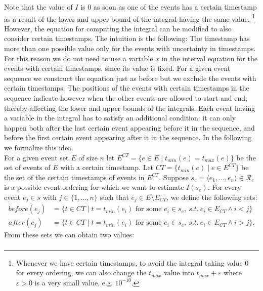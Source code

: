 \begin{itemize}
%
%
%
Note that the value of $I$ is 0 as soon as one of the events has a certain timestamp as a result of the lower and upper bound of the integral having the same value.
\footnote{Whenever we have certain timestamps, to avoid the integral taking value 0 for every ordering, we can also change the $t_{max}$ value into $t_{max}+\varepsilon$ where $\varepsilon > 0$ is a very small value, e.g. $10^{-10}$.}
However, the equation for computing the integral can be modified to also consider certain timestamps. 
The intuition is the following: The timestamp has more than one possible value only for the events with uncertainty in timestamps.
For this reason we do not need to use a variable $x$ in the interval equation for the events with certain timestamps, since its value is fixed.
For a given event sequence we construct the equation just as before but we exclude the events with certain timestamps.
The positions of the events with certain timestamps in the sequence indicate however when the other events are allowed to start and end, thereby affecting the lower and upper bounds of the integrals.
Each event having a variable in the integral has to satisfy an additional condition:
it can only happen both after the last certain event appearing before it in the sequence, and before the first certain event appearing after it in the sequence.
In the following we formalize this idea.\\
For a given event set $E$ of size $n$ let 
$E^{CT} = \{e \in E \mid t_{min}(e) = t_{max}(e)\}$
be the set of events of $E$ with a certain timestamp.
Let $CT = \{t_{min}(e) \mid e \in E^{CT}\}$ be the set of the certain timestamps of events in $E^{CT}$.
Suppose $s_e=\langle e_1,...,e_n \rangle \in \mathcal{R}_e$ is a possible event ordering for which we want to estimate $I(s_e)$.
For every event $e_j \in s$ with $j \in \{1,...,n\}$ such that $e_j \in E \setminus E_{CT}$, we define the following sets:
\begin{align*}
before(e_j) &= \{t \in CT \mid t=t_{min}(e_i) \text{ for some } e_i \in s_e, ~ s.t. ~ e_i \in E_{CT} \wedge i<j\} \\
after(e_j) &= \{t \in CT \mid t=t_{min}(e_i) \text{ for some } e_i \in s_e, ~ s.t. ~ e_i \in E_{CT} \wedge i>j\}.
\end{align*}
From these sets we can obtain two values: 
\begin{align*}

\end{align*}
\end{itemize}
